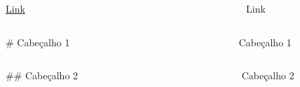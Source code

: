 \documentclass[
]{book}
\begin{document}
\begin{columns}

\begin{column}

\href{des.uem.br}{Link}

\end{column}

\begin{column}

~

\end{column}

\begin{column}

Link

\end{column}

\end{columns}

\begin{columns}

\begin{column}

\# Cabeçalho 1

\end{column}

\begin{column}

~

\end{column}

\begin{column}

\hypertarget{cabeuxe7alho-1}{}
\begin{section}

Cabeçalho 1

\end{section}

\end{column}

\end{columns}

\begin{columns}

\begin{column}

\#\# Cabeçalho 2

\end{column}

\begin{column}

~

\end{column}

\begin{column}

\hypertarget{cabeuxe7alho-2}{}
\begin{section}

Cabeçalho 2

\end{section}

\end{column}

\end{columns}
\end{document}
